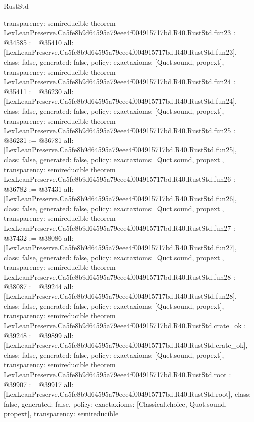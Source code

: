 \begin{lexlean}{RustStd}
\begin{coremodule}
{  transparency: semireducible
}
theorem LexLeanPreserve.Ca5fe8b9d64595a79eee4f004915717bd.R40.RustStd.fun23 : @34585 := @35410 {
  all: [LexLeanPreserve.Ca5fe8b9d64595a79eee4f004915717bd.R40.RustStd.fun23],
  class: false,
  generated: false,
  policy: exact{axioms: [Quot.sound, propext]},
  transparency: semireducible
}
theorem LexLeanPreserve.Ca5fe8b9d64595a79eee4f004915717bd.R40.RustStd.fun24 : @35411 := @36230 {
  all: [LexLeanPreserve.Ca5fe8b9d64595a79eee4f004915717bd.R40.RustStd.fun24],
  class: false,
  generated: false,
  policy: exact{axioms: [Quot.sound, propext]},
  transparency: semireducible
}
theorem LexLeanPreserve.Ca5fe8b9d64595a79eee4f004915717bd.R40.RustStd.fun25 : @36231 := @36781 {
  all: [LexLeanPreserve.Ca5fe8b9d64595a79eee4f004915717bd.R40.RustStd.fun25],
  class: false,
  generated: false,
  policy: exact{axioms: [Quot.sound, propext]},
  transparency: semireducible
}
theorem LexLeanPreserve.Ca5fe8b9d64595a79eee4f004915717bd.R40.RustStd.fun26 : @36782 := @37431 {
  all: [LexLeanPreserve.Ca5fe8b9d64595a79eee4f004915717bd.R40.RustStd.fun26],
  class: false,
  generated: false,
  policy: exact{axioms: [Quot.sound, propext]},
  transparency: semireducible
}
theorem LexLeanPreserve.Ca5fe8b9d64595a79eee4f004915717bd.R40.RustStd.fun27 : @37432 := @38086 {
  all: [LexLeanPreserve.Ca5fe8b9d64595a79eee4f004915717bd.R40.RustStd.fun27],
  class: false,
  generated: false,
  policy: exact{axioms: [Quot.sound, propext]},
  transparency: semireducible
}
theorem LexLeanPreserve.Ca5fe8b9d64595a79eee4f004915717bd.R40.RustStd.fun28 : @38087 := @39244 {
  all: [LexLeanPreserve.Ca5fe8b9d64595a79eee4f004915717bd.R40.RustStd.fun28],
  class: false,
  generated: false,
  policy: exact{axioms: [Quot.sound, propext]},
  transparency: semireducible
}
theorem LexLeanPreserve.Ca5fe8b9d64595a79eee4f004915717bd.R40.RustStd.crate_ok : @39248 := @39899 {
  all: [LexLeanPreserve.Ca5fe8b9d64595a79eee4f004915717bd.R40.RustStd.crate_ok],
  class: false,
  generated: false,
  policy: exact{axioms: [Quot.sound, propext]},
  transparency: semireducible
}
theorem LexLeanPreserve.Ca5fe8b9d64595a79eee4f004915717bd.R40.RustStd.root : @39907 := @39917 {
  all: [LexLeanPreserve.Ca5fe8b9d64595a79eee4f004915717bd.R40.RustStd.root],
  class: false,
  generated: false,
  policy: exact{axioms: [Classical.choice, Quot.sound, propext]},
  transparency: semireducible
}


\end{coremodule}
\end{lexlean}
